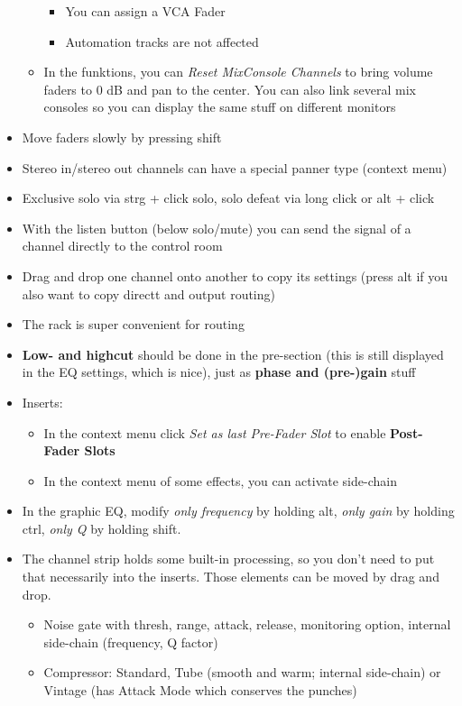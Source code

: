 \documentclass[10pt]{article}
\begin{document}
\begin{itemize}
\begin{itemize}
\begin{itemize}
			\item You can assign a VCA Fader
			\item Automation tracks are not affected
		\end{itemize}
		\item In the funktions, you can \textit{Reset MixConsole Channels} to bring volume faders to 0 dB and pan to the center. You can also link several mix consoles so you can display the same stuff on different monitors
	\end{itemize}
	\item Move faders slowly by pressing shift
	\item Stereo in/stereo out channels can have a special panner type (context menu)
	\item Exclusive solo via strg + click solo, solo defeat via long click or alt + click
	\item With the listen button (below solo/mute) you can send the signal of a channel directly to the control room
	\item Drag and drop one channel onto another to copy its settings (press alt if you also want to copy directt and output routing)
	\item The rack is super convenient for routing
	\item \textbf{Low- and highcut} should be done in the pre-section (this is still displayed in the EQ settings, which is nice), just as \textbf{phase and (pre-)gain} stuff
	\item Inserts:
	\begin{itemize}
		\item In the context menu click \textit{Set as last Pre-Fader Slot} to enable \textbf{Post-Fader Slots}
		\item In the context menu of some effects, you can activate side-chain
	\end{itemize}
	\item In the graphic EQ, modify \textit{only frequency} by holding alt, \textit{only gain} by holding ctrl, \textit{only Q} by holding shift.
	\item The channel strip holds some built-in processing, so you don't need to put that necessarily into the inserts. Those elements can be moved by drag and drop.
	\begin{itemize}
		\item Noise gate with thresh, range, attack, release, monitoring option, internal side-chain (frequency, Q factor)
		\item Compressor: Standard, Tube (smooth and warm; internal side-chain) or Vintage (has Attack Mode which conserves the punches)

\end{itemize}
\end{itemize}
\end{document}
